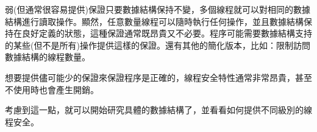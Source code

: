 弱(但通常很容易提供)保證只要數據結構保持不變，多個線程就可以對相同的數據結構進行讀取操作。顯然，任意數量線程可以隨時執行任何操作，並且數據結構保持在良好定義的狀態，這種保證通常既昂貴又不必要。程序可能需要數據結構支持的某些(但不是所有)操作提供這樣的保證。還有其他的簡化版本，比如：限制訪問數據結構的線程數量。

想要提供儘可能少的保證來保證程序是正確的，線程安全特性通常非常昂貴，甚至不使用時也會產生開銷。

考慮到這一點，就可以開始研究具體的數據結構了，並看看如何提供不同級別的線程安全。

































